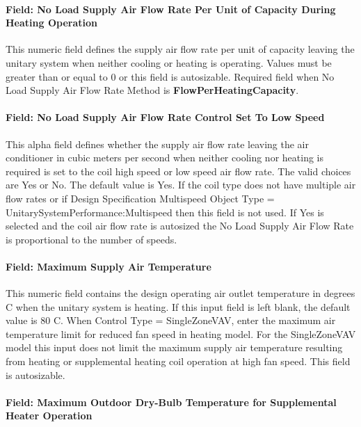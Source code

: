 \paragraph{Field: No Load Supply Air Flow Rate Per Unit of Capacity During Heating Operation}\label{field-no-load-supply-air-flow-rate-per-unit-of-capacity-during-heating-operation}

This numeric field defines the supply air flow rate per unit of capacity leaving the unitary system when neither cooling or heating is operating. Values must be greater than or equal to 0 or this field is autosizable. Required field when No Load Supply Air Flow Rate Method is \textbf{FlowPerHeatingCapacity}.

\paragraph{Field: No Load Supply Air Flow Rate Control Set To Low Speed}\label{field-no-load-supply-air-flow-rate-control-set-to-low-speed-004}

This alpha field defines whether the supply air flow rate leaving the air conditioner in cubic meters per second when neither cooling nor heating is required is set to the coil high speed or low speed air flow rate. The valid choices are Yes or No. The default value is Yes. If the coil type does not have multiple air flow rates or if Design Specification Multispeed Object Type = UnitarySystemPerformance:Multispeed then this field is not used. If Yes is selected and the coil air flow rate is autosized the No Load Supply Air Flow Rate is proportional to the number of speeds.

\paragraph{Field: Maximum Supply Air Temperature}\label{field-maximum-supply-air-temperature-000}

This numeric field contains the design operating air outlet temperature in degrees C when the unitary system is heating. If this input field is left blank, the default value is 80 C. When Control Type = SingleZoneVAV, enter the maximum air temperature limit for reduced fan speed in heating model. For the SingleZoneVAV model this input does not limit the maximum supply air temperature resulting from heating or supplemental heating coil operation at high fan speed.  This field is autosizable.


\paragraph{Field: Maximum Outdoor Dry-Bulb Temperature for Supplemental Heater Operation}\label{field-maximum-outdoor-dry-bulb-temperature-for-supplemental-heater-operation}

